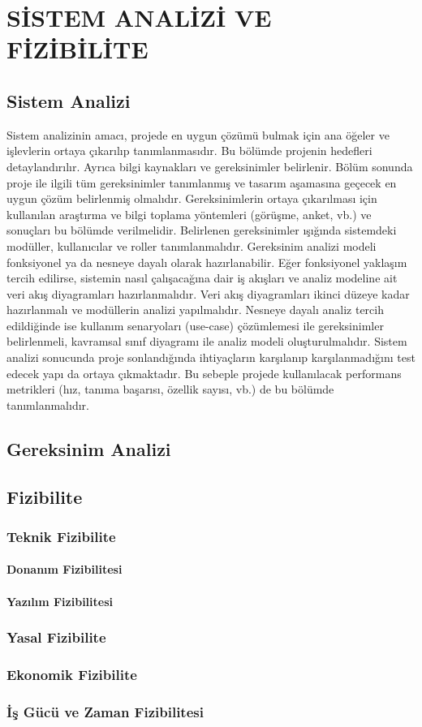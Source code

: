 \chapter{SİSTEM ANALİZİ VE FİZİBİLİTE}
\section{Sistem Analizi}
Sistem analizinin amacı, projede en uygun çözümü bulmak için ana öğeler ve işlevlerin ortaya çıkarılıp tanımlanmasıdır. Bu bölümde projenin hedefleri detaylandırılır. Ayrıca bilgi kaynakları ve gereksinimler belirlenir. Bölüm sonunda proje ile ilgili tüm gereksinimler tanımlanmış ve tasarım aşamasına geçecek en uygun çözüm belirlenmiş olmalıdır.
Gereksinimlerin ortaya çıkarılması için kullanılan araştırma ve bilgi toplama yöntemleri (görüşme, anket, vb.) ve sonuçları bu bölümde verilmelidir. Belirlenen gereksinimler ışığında sistemdeki modüller, kullanıcılar ve roller tanımlanmalıdır. Gereksinim analizi modeli fonksiyonel ya da nesneye dayalı olarak hazırlanabilir.
Eğer fonksiyonel yaklaşım tercih edilirse, sistemin nasıl çalışacağına dair iş akışları ve analiz modeline ait veri akış diyagramları hazırlanmalıdır. Veri akış diyagramları ikinci düzeye kadar hazırlanmalı ve modüllerin analizi yapılmalıdır. Nesneye dayalı analiz tercih edildiğinde ise kullanım senaryoları (use-case) çözümlemesi ile gereksinimler belirlenmeli, kavramsal sınıf diyagramı ile analiz modeli oluşturulmalıdır.
Sistem analizi sonucunda proje sonlandığında ihtiyaçların karşılanıp karşılanmadığını test edecek yapı da ortaya çıkmaktadır. Bu sebeple projede kullanılacak performans metrikleri (hız, tanıma başarısı, özellik sayısı, vb.) de bu bölümde tanımlanmalıdır.

\section{Gereksinim Analizi}

\section{Fizibilite}

\subsection{Teknik Fizibilite}
\subsubsection{Donanım Fizibilitesi}
\subsubsection{Yazılım Fizibilitesi}
\subsection{Yasal Fizibilite}
\subsection{Ekonomik Fizibilite}
\subsection{İş Gücü ve Zaman Fizibilitesi}
